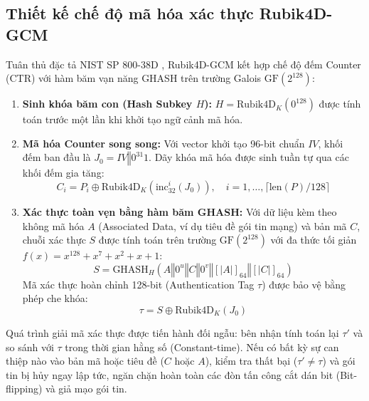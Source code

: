 \documentclass[10pt,twocolumn]{article}
\begin{document}
\subsection{Thiết kế chế độ mã hóa xác thực Rubik4D-GCM}
Tuân thủ đặc tả NIST SP 800-38D \cite{dworkin2007gcm}, Rubik4D-GCM kết hợp chế độ đếm Counter (CTR) với hàm băm vạn năng GHASH trên trường Galois $\text{GF}(2^{128})$:
\begin{enumerate}
    \item \textbf{Sinh khóa băm con (Hash Subkey $H$):} $H = \text{Rubik4D}_K(0^{128})$ được tính toán trước một lần khi khởi tạo ngữ cảnh mã hóa.
    \item \textbf{Mã hóa Counter song song:} Với vector khởi tạo 96-bit chuẩn $IV$, khối đếm ban đầu là $J_0 = IV \mathbin{\Vert} 0^{31}1$. Dãy khóa mã hóa được sinh tuần tự qua các khối đếm gia tăng:
    \begin{equation}
        C_i = P_i \oplus \text{Rubik4D}_K(\text{inc}_{32}^i(J_0)), \quad i = 1, \dots, \lceil \text{len}(P)/128 \rceil
    \end{equation}
    \item \textbf{Xác thực toàn vẹn bằng hàm băm GHASH:} Với dữ liệu kèm theo không mã hóa $A$ (Associated Data, ví dụ tiêu đề gói tin mạng) và bản mã $C$, chuỗi xác thực $S$ được tính toán trên trường $\text{GF}(2^{128})$ với đa thức tối giản $f(x) = x^{128} + x^7 + x^2 + x + 1$:
    \begin{equation}
        S = \text{GHASH}_H(A \mathbin{\Vert} 0^u \mathbin{\Vert} C \mathbin{\Vert} 0^v \mathbin{\Vert} [|A|]_{64} \mathbin{\Vert} [|C|]_{64})
    \end{equation}
    Mã xác thực hoàn chỉnh 128-bit (Authentication Tag $\tau$) được bảo vệ bằng phép che khóa:
    \begin{equation}
        \tau = S \oplus \text{Rubik4D}_K(J_0)
    \end{equation}
\end{enumerate}

Quá trình giải mã xác thực được tiến hành đối ngẫu: bên nhận tính toán lại $\tau'$ và so sánh với $\tau$ trong thời gian hằng số (Constant-time). Nếu có bất kỳ sự can thiệp nào vào bản mã hoặc tiêu đề ($C$ hoặc $A$), kiểm tra thất bại ($\tau' \neq \tau$) và gói tin bị hủy ngay lập tức, ngăn chặn hoàn toàn các đòn tấn công cắt dán bit (Bit-flipping) và giả mạo gói tin.
\end{document}
